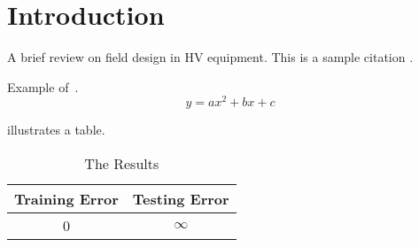\section{Introduction}
A brief review on field design in HV equipment. This is a sample citation \cite{kuffel2000high}.

Example of~.
\begin{equation}
y = ax^2 + bx + c
\label{eq:equation1}
\end{equation}


 illustrates a table.
\begin{table}[!htb]
  \centering
\caption{The Results}
  \begin{tabular}{cc}
  \toprule
  \textbf{Training Error} & \textbf{Testing Error}\\
  \midrule
  0 & $\infty$\\
  \bottomrule
  \end{tabular}
  \label{Table:tabex}
\end{table}

\lipsum